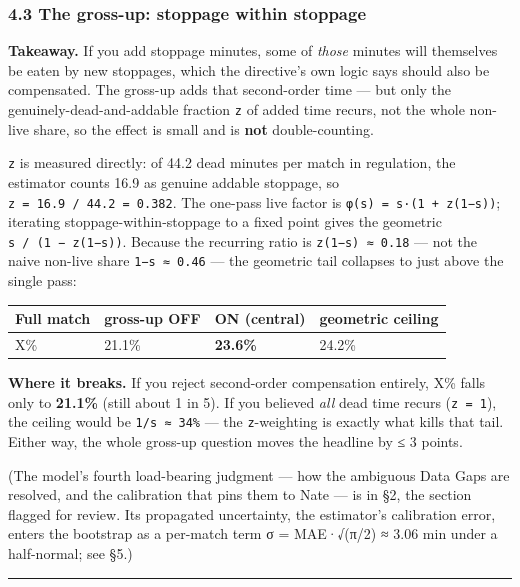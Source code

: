 \documentclass[
]{article}
\begin{document}
\subsubsection{4.3 The gross-up: stoppage within
stoppage}\label{the-gross-up-stoppage-within-stoppage}

\textbf{Takeaway.} If you add stoppage minutes, some of \emph{those}
minutes will themselves be eaten by new stoppages, which the directive's
own logic says should also be compensated. The gross-up adds that
second-order time --- but only the genuinely-dead-and-addable fraction
\texttt{z} of added time recurs, not the whole non-live share, so the
effect is small and is \textbf{not} double-counting.

\texttt{z} is measured directly: of 44.2 dead minutes per match in
regulation, the estimator counts 16.9 as genuine addable stoppage, so
\texttt{z\ =\ 16.9\ /\ 44.2\ =\ 0.382}. The one-pass live factor is
\texttt{φ(s)\ =\ s·(1\ +\ z(1−s))}; iterating stoppage-within-stoppage
to a fixed point gives the geometric \texttt{s\ /\ (1\ −\ z(1−s))}.
Because the recurring ratio is \texttt{z(1−s)\ ≈\ 0.18} --- not the
naive non-live share \texttt{1−s\ ≈\ 0.46} --- the geometric tail
collapses to just above the single pass:

\begin{longtable}[]{@{}llll@{}}
\toprule\noalign{}
Full match & gross-up OFF & \textbf{ON (central)} & geometric ceiling \\
\midrule\noalign{}
\endhead
\bottomrule\noalign{}
\endlastfoot
X\% & 21.1\% & \textbf{23.6\%} & 24.2\% \\
\end{longtable}

\textbf{Where it breaks.} If you reject second-order compensation
entirely, X\% falls only to \textbf{21.1\%} (still about 1 in 5). If you
believed \emph{all} dead time recurs (\texttt{z\ =\ 1}), the ceiling
would be \texttt{1/s\ ≈\ 34\%} --- the \texttt{z}-weighting is exactly
what kills that tail. Either way, the whole gross-up question moves the
headline by ≤ 3 points.

(The model's fourth load-bearing judgment --- how the ambiguous Data
Gaps are resolved, and the calibration that pins them to Nate --- is in
§2, the section flagged for review. Its propagated uncertainty, the
estimator's calibration error, enters the bootstrap as a per-match term
σ = MAE·√(π/2) ≈ 3.06 min under a half-normal; see §5.)

\begin{center}\rule{0.5\linewidth}{0.5pt}\end{center}
\end{document}
